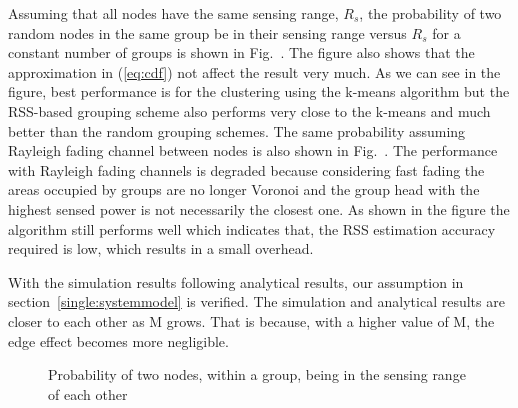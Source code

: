 Assuming that all nodes have the same sensing range, $R_s$, the probability of two random nodes in the same group be in their sensing range versus $R_s$ for a constant number of groups is shown in Fig.~. The figure also shows that the approximation in (\ref{eq:cdf}) not affect the result very much. As we can see in the figure, best performance is for the clustering using the k-means algorithm but the RSS-based grouping scheme also performs very close to the k-means and much better than the random grouping schemes. The same probability assuming Rayleigh fading channel between nodes is also shown in Fig.~. The performance with Rayleigh fading channels is degraded because considering fast fading the areas occupied by groups are no longer Voronoi and the group head with the highest sensed power is not necessarily the closest one. As shown in the figure the algorithm still performs well which indicates that, the RSS estimation accuracy required is low, which results in a small overhead.

With the simulation results following analytical results, our assumption in section~\ref{single:systemmodel} is verified. The simulation and analytical results are closer to each other as M grows. That is because, with a higher value of M, the edge effect becomes more negligible.


\begin{figure} [th]
  \centering
  \caption{Probability of two nodes, within a group, being in the sensing range of each other}
  \label{fig:probabilities}
\end{figure}


